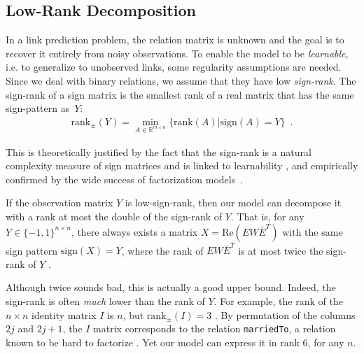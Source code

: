 \documentclass{article}
\newcommand{\diag}{\mathop{\textrm{diag}}}
\newcommand{\proba}{P}
\renewcommand{\Re}{\mathbb{R}}
\newcommand{\R}{\Re} %
\newcommand{\real}{\mathrm{Re}}
\newcommand{\srank}{\mathrm{rank}_{\pm}}
\newcommand{\lrank}{\mathrm{rank}}
\newcommand{\sign}{\mathrm{sign}}
\begin{document}
\subsection{Low-Rank Decomposition}

In a link prediction problem, the relation matrix is unknown and the goal is to recover it entirely from noisy observations. To enable the model to be \emph{learnable}, i.e. to generalize to unobserved links, some regularity assumptions are needed. Since we deal with binary relations, we assume that they have low \emph{sign-rank}. The sign-rank of a sign matrix is the smallest rank of a real matrix that has the same sign-pattern as~$Y$:
\begin{eqnarray}
    \srank(Y) = \min_{A\in \R^{m \times n}} \{\lrank(A) | \sign(A) = Y \}\enspace.
\end{eqnarray}

This is theoretically justified by the fact that the sign-rank is a natural complexity measure of sign matrices \mbox{\cite{Linial2007}} and is linked to learnability \cite{alon2015sign}, and empirically confirmed by the wide success of factorization models~\cite{nickel_2016_review}. 

If the observation matrix $Y$ is low-sign-rank, then our
model can decompose it with a rank at most the double of
the sign-rank of $Y$.
That is, for any $Y\in\{-1,1\}^{n\times n}$, there always exists a matrix $X = \real(E W \bar{E}^T)$ with the same sign pattern $\sign(X)=Y$, where the rank of $E W \bar{E}^T$ is at most twice the sign-rank of $Y$ \cite{trouillon_unitdiag2016}.

Although twice sounds bad, this is actually a good upper bound. Indeed, the sign-rank is often \emph{much} lower than the rank
of $Y$. For example, the rank of the $n \times n$ identity matrix
$I$ is $n$, but $\srank(I)=3$ \cite{alon2015sign}. By permutation
of the columns $2j$ and $2j+1$, the $I$ matrix corresponds to the
relation \texttt{marriedTo}, a relation known to be hard to
factorize \cite{Nickel2014}. Yet our model can express it in rank 6, for any $n$.



\end{document}
